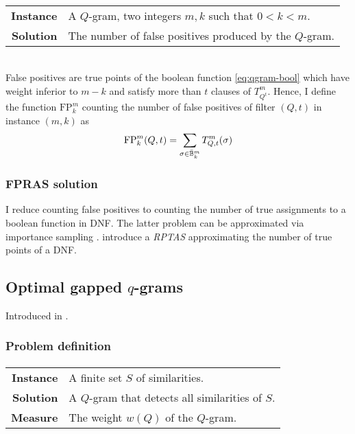 \paragraph{}
\begin{tabular}{rl}
{\bf Instance}	&	A $Q$-gram, two integers $m,k$ such that $0 < k < m$.\\
{\bf Solution}	&	The number of false positives produced by the $Q$-gram.\\
\end{tabular}
\\

False positives are true points of the boolean function \ref{eq:qgram-bool} which have weight inferior to $m-k$ and satisfy more than $t$ clauses of $T_{Q^t}^{m}$.
Hence, I define the function $\text{FP}_{k}^{m}$ counting the number of false positives of filter $(Q,t)$ in instance $(m,k)$ as
\begin{equation}
\text{FP}_{k}^{m}(Q,t) = \sum_{\sigma \in {\bar{\ensuremath{\mathbb {B}}}^{m}_{k}}} T_{Q,t}^{m}(\sigma)
\end{equation}

\subsubsection{FPRAS solution}

I reduce counting false positives to counting the number of true assignments to a boolean function in DNF.
The latter problem can be approximated via importance sampling \citep{Vazirani2001}.
\citeauthor{Karp1989} introduce a \emph{RPTAS} approximating the number of true points of a DNF.


\subsection{Optimal gapped $q$-grams}

Introduced in \citep{Nicolas2005}.

\subsubsection{Problem definition}

\paragraph{}
\begin{tabular}{rl}
{\bf Instance}	&	A finite set $S$ of similarities.\\
{\bf Solution}	&	A $Q$-gram that detects all similarities of $S$.\\
{\bf Measure}	&	The weight $w(Q)$ of the $Q$-gram.\\
\end{tabular}
\\


